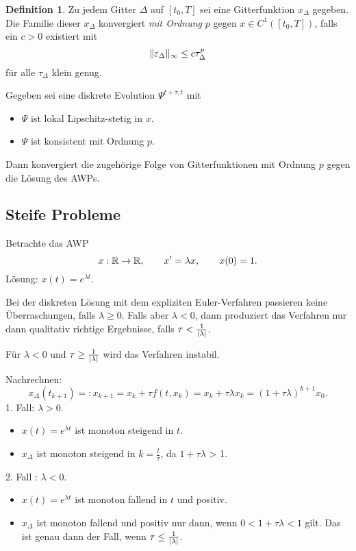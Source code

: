 \documentclass[
 a4paper,
 12pt,
 parskip=half
 ]{scrreprt}
\theoremstyle{plain}
\theoremstyle{definition}
\numberwithin{rmrk}{chapter}
\numberwithin{defn}{chapter}
\numberwithin{exmp}{chapter}
\numberwithin{prgp}{subsection}
\newtheorem*{defn*}{Definition}
\numberwithin{equation}{chapter}
\begin{document}
\begin{defn*}
  Zu jedem Gitter $\Delta$ auf $[t_0,T]$ sei eine Gitterfunktion $x_\Delta$
  gegeben. Die Familie dieser $x_\Delta$ konvergiert \emph{mit Ordnung} $p$
  gegen $x \in C^1([t_0,T])$, falls ein $c > 0$ existiert mit
  \[ \| \varepsilon_\Delta \|_\infty \le c \tau_\Delta^p \]
  für alle $\tau_\Delta$ klein genug.
\end{defn*}

\begin{thm}
  Gegeben sei eine diskrete Evolution $\Psi^{t+\tau,t}$ mit
  \begin{itemize}
  \item $\Psi$ ist lokal Lipschitz-stetig in $x$.
  \item $\Psi$ ist konsistent mit Ordnung $p$.
  \end{itemize}
  Dann konvergiert die zugehörige Folge von Gitterfunktionen mit Ordnung $p$
  gegen die Lösung des AWPs.
\end{thm}

\subsection{Steife Probleme}
Betrachte das AWP
\[ x: \mathbb{R} \to \mathbb{R}, \qquad
  x' = \lambda x, \qquad
  x(0) = 1. \]
Lösung: $x(t) = e^{\lambda t}$.

Bei der diskreten Lösung mit dem expliziten Euler-Verfahren passieren keine
Überraschungen, falls $\lambda \ge 0$. Falls aber $\lambda < 0$, dann 
produziert das Verfahren nur dann qualitativ richtige Ergebnisse, falls $\tau <
\frac{1}{|\lambda|}$. 

Für $\lambda < 0$ und $\tau \ge \frac{1}{|\lambda|}$ wird das Verfahren instabil.

Nachrechnen:
\[ x_\Delta(t_{k+1}) =: x_{k+1} = x_k + \tau f(t,x_k)
  = x_k + \tau \lambda x_k = (1+ \tau \lambda)^{k+1} x_0. \]
1. Fall: $\lambda > 0$.
\begin{itemize}
\item $x(t) = e^{\lambda t}$ ist monoton steigend in $t$.
\item $x_\Delta$ ist monoton steigend in $k = \frac{t}{\tau}$, da $1+\tau
  \lambda$ > 1.
\end{itemize}

2. Fall : $\lambda < 0$.
\begin{itemize}
\item $x(t) = e^{\lambda t}$ ist monoton fallend in $t$ und positiv.
\item $x_\Delta$ ist monoton fallend und positiv nur dann, wenn $0 < 1 + \tau
  \lambda < 1$ gilt. Das ist genau dann der Fall, wenn $\tau \le
  \frac{1}{|\lambda|}$. 
\end{itemize}
\end{document}
